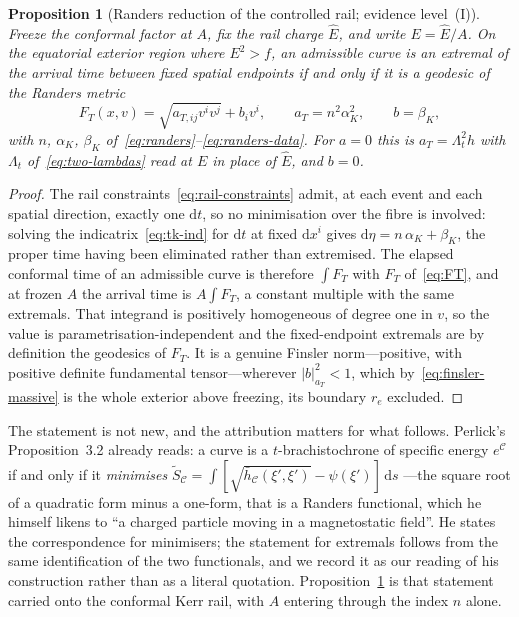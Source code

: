 \documentclass[12pt]{iopart}
\theoremstyle{plain}
\newtheorem{proposition}{Proposition}
\theoremstyle{definition}
\theoremstyle{remark}
\newcommand{\Ehat}{\hat E}
\newcommand{\re}{r_{e}}
\newcommand{\dd}{\mathrm{d}}
\begin{document}
\begin{proposition}[Randers reduction of the controlled rail; evidence
level~(I)]
\label{prop:randers-reduction}
Freeze the conformal factor at $A$, fix the rail charge $\Ehat$, and write
$E=\Ehat/A$. On the equatorial exterior region where $E^2>f$, an admissible
curve is an extremal of the arrival time between fixed spatial endpoints if and
only if it is a geodesic of the Randers metric
\begin{equation}
    F_T(x,v)=\sqrt{a_{T,ij}v^iv^j}+b_iv^i ,
    \qquad a_T=n^2\alpha_K^2 ,\qquad b=\beta_K ,
    \label{eq:FT}
\end{equation}
with $n$, $\alpha_K$, $\beta_K$
of~\eqref{eq:randers}--\eqref{eq:randers-data}. For $a=0$ this is
$a_T=\Lambda_t^2h$ with $\Lambda_t$ of~\eqref{eq:two-lambdas} read at $E$ in
place of $\Ehat$, and $b=0$.
\end{proposition}

\begin{proof}
The rail constraints~\eqref{eq:rail-constraints} admit, at each event and each
spatial direction, exactly one $\dd t$, so no minimisation over the fibre is
involved: solving the indicatrix~\eqref{eq:tk-ind} for $\dd t$ at fixed
$\dd x^i$ gives $\dd\eta=n\,\alpha_K+\beta_K$, the proper time having been
eliminated rather than extremised. The elapsed conformal time of an admissible
curve is therefore $\int F_T$ with $F_T$ of~\eqref{eq:FT}, and at frozen $A$ the
arrival time is $A\int F_T$, a constant multiple with the same extremals. That
integrand is positively
homogeneous of degree one in $v$, so the value is parametrisation-independent
and the fixed-endpoint extremals are by definition the geodesics of $F_T$. It is
a genuine Finsler norm---positive, with positive definite fundamental
tensor---wherever $|b|^2_{a_T}<1$, which by~\eqref{eq:finsler-massive} is the
whole exterior above freezing, its boundary $\re$ excluded.
\end{proof}

The statement is not new, and the attribution matters for what follows. Perlick's
Proposition~3.2 already reads: a curve is a $t$-brachistochrone of specific
energy $e^{\mathcal C}$ if and only if it \emph{minimises} $\tilde S_{\mathcal
C}=\int[\sqrt{\bar h_{\mathcal C}(\xi',\xi')}-\psi(\xi')]\,\dd s$
\cite[p.~3153]{Perlick1991}---the square root of a quadratic form minus a
one-form, that is a Randers functional, which he himself likens to ``a charged
particle moving in a magnetostatic field''. He states the correspondence for
minimisers; the statement for extremals follows from the same identification of
the two functionals, and we record it as our reading of his construction rather
than as a literal quotation.
Proposition~\ref{prop:randers-reduction} is that statement carried onto the
conformal Kerr rail, with $A$ entering through the index $n$ alone.
\end{document}
